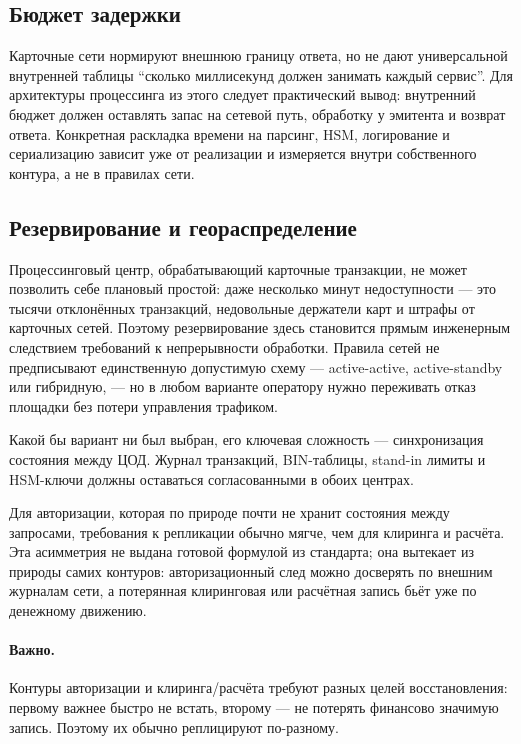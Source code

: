 \subsection*{Бюджет задержки}

Карточные сети нормируют внешнюю границу ответа, но не дают
универсальной внутренней таблицы \enquote{сколько миллисекунд
должен занимать каждый сервис}. Для архитектуры процессинга
из этого следует практический вывод: внутренний бюджет должен
оставлять запас на сетевой путь, обработку у эмитента
и возврат ответа. Конкретная раскладка времени на парсинг,
HSM, логирование и сериализацию зависит уже от реализации
и измеряется внутри собственного контура, а не в правилах сети.

\subsection*{Резервирование и геораспределение}

Процессинговый центр, обрабатывающий карточные транзакции,
не может позволить себе плановый простой: даже несколько минут
недоступности — это тысячи отклонённых транзакций, недовольные
держатели карт и штрафы от карточных сетей. Поэтому резервирование
здесь становится прямым инженерным следствием
требований к непрерывности обработки. Правила сетей не
предписывают единственную допустимую схему --- active-active,
active-standby или гибридную, --- но в любом варианте
оператору нужно переживать отказ площадки без потери
управления трафиком.

Какой бы вариант ни был выбран, его ключевая сложность —
синхронизация состояния между ЦОД. Журнал транзакций,
BIN-таблицы, stand-in лимиты и HSM-ключи должны оставаться
согласованными в обоих центрах.

Для авторизации, которая по природе почти не хранит состояния
между запросами, требования к репликации обычно мягче,
чем для клиринга и расчёта. Эта асимметрия не выдана
готовой формулой из стандарта; она вытекает из природы самих
контуров: авторизационный след можно досверять по внешним
журналам сети, а потерянная клиринговая или расчётная запись
бьёт уже по денежному движению.

\paragraph{Важно.}
Контуры авторизации и клиринга/расчёта требуют разных целей восстановления: первому важнее быстро не встать, второму --- не потерять финансово значимую запись. Поэтому их обычно реплицируют по-разному.



